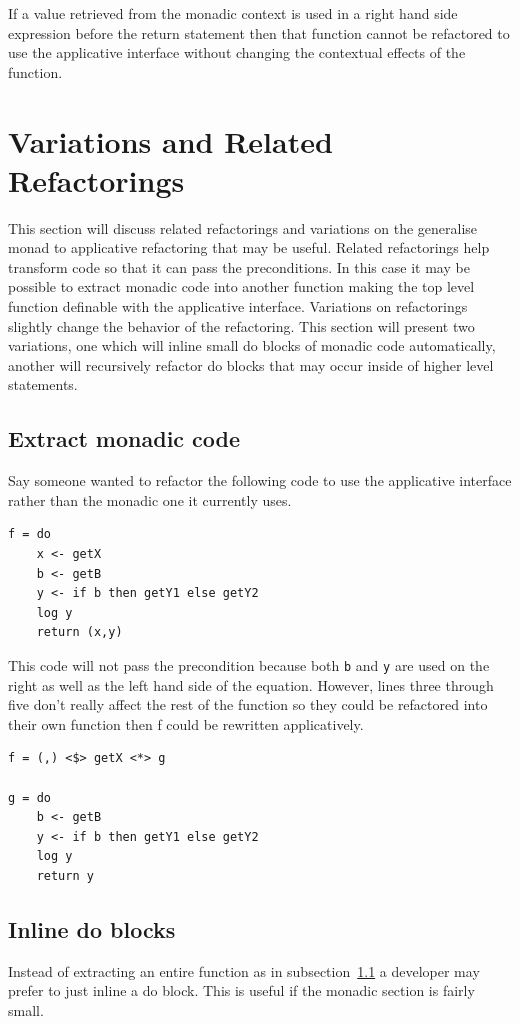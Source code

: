 If a value retrieved from the monadic context is used in a right hand side expression before the return statement then that function cannot be refactored to use the applicative interface without changing the contextual effects of the function. 

\section{Variations and Related Refactorings}
\label{sec:appVariations}

This section will discuss related refactorings and variations on the generalise monad to applicative refactoring that may be useful. Related refactorings help transform code so that it can pass the preconditions. In this case it may be possible to extract monadic code into another function making the top level function definable with the applicative interface. Variations on refactorings slightly change the behavior of the refactoring. This section will present two variations, one which will inline small do blocks of monadic code automatically, another will
recursively refactor do blocks that may occur inside of higher level statements.

\subsection{Extract monadic code}
\label{subSec:extract}
Say someone wanted to refactor the following code to use the applicative interface rather than the monadic one it currently uses.

\begin{lstlisting}[frame=tblr]
f = do
	x <- getX
	b <- getB
	y <- if b then getY1 else getY2
	log y
	return (x,y)	
\end{lstlisting}

This code will not pass the precondition because both \texttt{b} and \texttt{y} are used on the right as well as the left hand side of the equation. However, lines three through five don't really affect the rest of the function so they could be refactored into their own function then f could be rewritten applicatively.

\begin{lstlisting}[frame=tblr]
f = (,) <$> getX <*> g

g = do
	b <- getB
	y <- if b then getY1 else getY2
	log y
	return y
\end{lstlisting}

\subsection{Inline do blocks}
Instead of extracting an entire function as in subsection~\ref{subSec:extract} a developer may prefer to just inline a do block. This is useful if the monadic section is fairly small.

